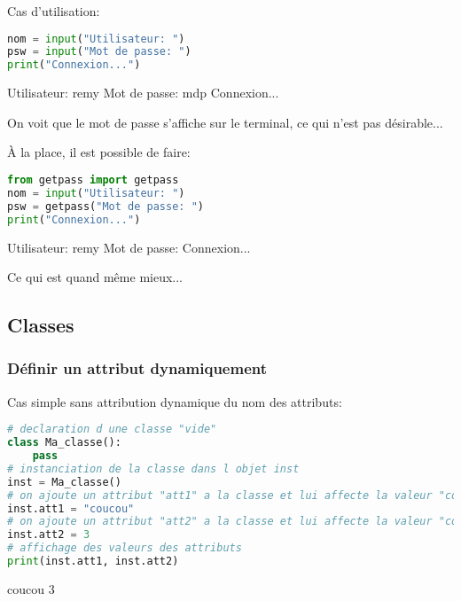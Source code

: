 Cas d'utilisation:
\begin{lstlisting}[language=Python]
nom = input("Utilisateur: ")
psw = input("Mot de passe: ")
print("Connexion...")
\end{lstlisting}
\begin{terminal}
Utilisateur: remy
Mot de passe: mdp
Connexion...
\end{terminal}
On voit que le mot de passe s'affiche sur le terminal, ce qui n'est pas désirable... 

À la place, il est possible de faire:
\begin{lstlisting}[language=Python]
from getpass import getpass
nom = input("Utilisateur: ")
psw = getpass("Mot de passe: ")
print("Connexion...")
\end{lstlisting}
\begin{terminal}
Utilisateur: remy
Mot de passe:
Connexion...
\end{terminal}
Ce qui est quand même mieux...


\subsection{Classes}

\subsubsection{Définir un attribut dynamiquement}

Cas simple sans attribution dynamique du nom des attributs:
\begin{lstlisting}[language=Python]
# declaration d une classe "vide"
class Ma_classe():
    pass
# instanciation de la classe dans l objet inst
inst = Ma_classe()
# on ajoute un attribut "att1" a la classe et lui affecte la valeur "coucou"
inst.att1 = "coucou"
# on ajoute un attribut "att2" a la classe et lui affecte la valeur "coucou"
inst.att2 = 3
# affichage des valeurs des attributs
print(inst.att1, inst.att2)
\end{lstlisting}
\begin{terminal}
coucou 3
\end{terminal}

